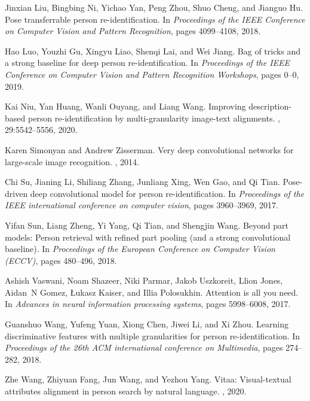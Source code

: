 \documentclass[final]{cvpr}
\begin{document}
\begin{thebibliography}{10}
Jinxian Liu, Bingbing Ni, Yichao Yan, Peng Zhou, Shuo Cheng, and Jianguo Hu.
\newblock Pose transferrable person re-identification.
\newblock In {\em Proceedings of the IEEE Conference on Computer Vision and
  Pattern Recognition}, pages 4099--4108, 2018.

Hao Luo, Youzhi Gu, Xingyu Liao, Shenqi Lai, and Wei Jiang.
\newblock Bag of tricks and a strong baseline for deep person
  re-identification.
\newblock In {\em Proceedings of the IEEE Conference on Computer Vision and
  Pattern Recognition Workshops}, pages 0--0, 2019.

Kai Niu, Yan Huang, Wanli Ouyang, and Liang Wang.
\newblock Improving description-based person re-identification by
  multi-granularity image-text alignments.
, 29:5542--5556, 2020.

Karen Simonyan and Andrew Zisserman.
\newblock Very deep convolutional networks for large-scale image recognition.
, 2014.

Chi Su, Jianing Li, Shiliang Zhang, Junliang Xing, Wen Gao, and Qi Tian.
\newblock Pose-driven deep convolutional model for person re-identification.
\newblock In {\em Proceedings of the IEEE international conference on computer
  vision}, pages 3960--3969, 2017.

Yifan Sun, Liang Zheng, Yi Yang, Qi Tian, and Shengjin Wang.
\newblock Beyond part models: Person retrieval with refined part pooling (and a
  strong convolutional baseline).
\newblock In {\em Proceedings of the European Conference on Computer Vision
  (ECCV)}, pages 480--496, 2018.

Ashish Vaswani, Noam Shazeer, Niki Parmar, Jakob Uszkoreit, Llion Jones,
  Aidan~N Gomez, {\L}ukasz Kaiser, and Illia Polosukhin.
\newblock Attention is all you need.
\newblock In {\em Advances in neural information processing systems}, pages
  5998--6008, 2017.

Guanshuo Wang, Yufeng Yuan, Xiong Chen, Jiwei Li, and Xi Zhou.
\newblock Learning discriminative features with multiple granularities for
  person re-identification.
\newblock In {\em Proceedings of the 26th ACM international conference on
  Multimedia}, pages 274--282, 2018.

Zhe Wang, Zhiyuan Fang, Jun Wang, and Yezhou Yang.
\newblock Vitaa: Visual-textual attributes alignment in person search by
  natural language.
, 2020.


\end{thebibliography}
\end{document}
